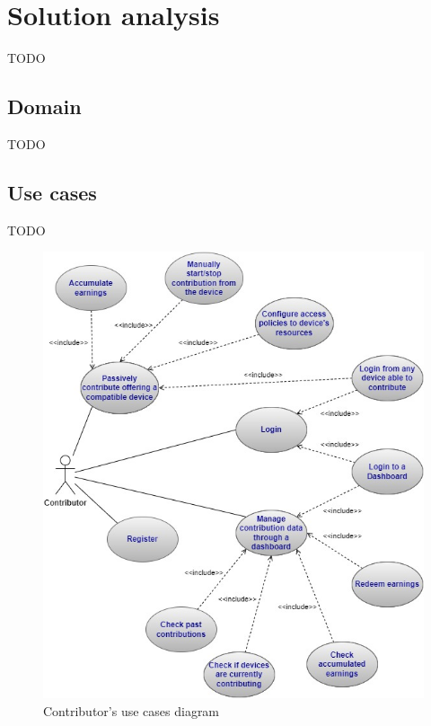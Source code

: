 \section{Solution analysis}
TODO

\subsection{Domain}
TODO

\subsection{Use cases}
TODO

\begin{figure}[!ht]
    \centering
    \includegraphics[width=\linewidth]{document/chapters/chapter_5/images/contributor_use_cases.jpg}
    \caption{Contributor's use cases diagram}
    \label{fig:use_cases_contributor}
\end{figure}

